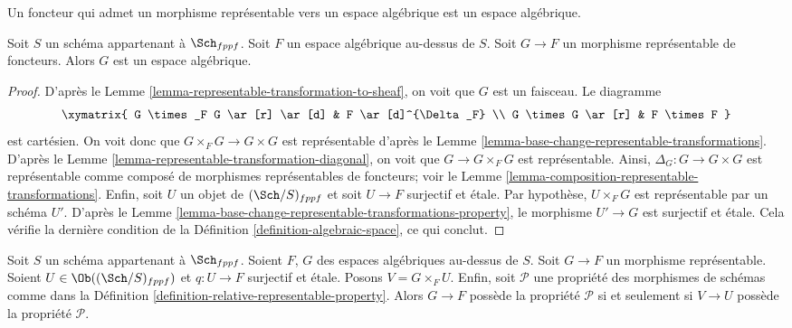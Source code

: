 \begin{lemma}
\label{lemma-representable-over-space}
\begin{slogan}
Un foncteur qui admet un morphisme représentable vers un espace algébrique est
un espace algébrique.
\end{slogan}
Soit $S$ un schéma appartenant à $\Sch_{fppf}$.
Soit $F$ un espace algébrique au-dessus de $S$.
Soit $G \to F$ un morphisme représentable de foncteurs.
Alors $G$ est un espace algébrique.
\end{lemma}

\begin{proof}
D'après le Lemme \ref{lemma-representable-transformation-to-sheaf},
on voit que $G$ est un faisceau. Le diagramme
$$
\xymatrix{
G \times_F G \ar[r] \ar[d] & F \ar[d]^{\Delta_F} \\
G \times G \ar[r] & F \times F
}
$$
est cartésien. On voit donc que $G \times_F G \to G \times G$
est représentable d'après le
Lemme \ref{lemma-base-change-representable-transformations}.
D'après le
Lemme \ref{lemma-representable-transformation-diagonal},
on voit que $G \to G \times_F G$ est représentable.
Ainsi, $\Delta_G : G \to G \times G$ est représentable comme composé
de morphismes représentables de foncteurs; voir le
Lemme \ref{lemma-composition-representable-transformations}.
Enfin, soit $U$ un objet de $(\Sch/S)_{fppf}$
et soit $U \to F$ surjectif et \'etale. Par hypothèse,
$U \times_F G$ est représentable par un schéma $U'$. D'après le
Lemme \ref{lemma-base-change-representable-transformations-property},
le morphisme $U' \to G$ est surjectif et \'etale. Cela vérifie
la dernière condition de la Définition \ref{definition-algebraic-space}, ce qui conclut.
\end{proof}

\begin{lemma}
\label{lemma-representable-morphisms-spaces-property}
Soit $S$ un schéma appartenant à $\Sch_{fppf}$.
Soient $F$, $G$ des espaces algébriques au-dessus de $S$.
Soit $G \to F$ un morphisme représentable.
Soient $U \in \Ob((\Sch/S)_{fppf})$ et $q : U \to F$
surjectif et \'etale. Posons $V = G \times_F U$.
Enfin, soit $\mathcal{P}$ une propriété des morphismes
de schémas comme dans la Définition \ref{definition-relative-representable-property}.
Alors $G \to F$ possède la propriété $\mathcal{P}$ si et seulement si
$V \to U$ possède la propriété $\mathcal{P}$.
\end{lemma}

